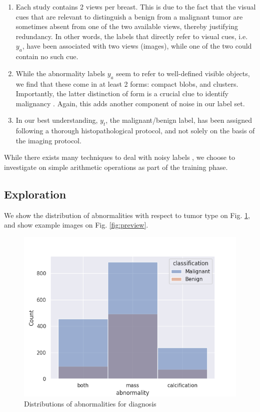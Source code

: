 \documentclass[11pt]{article}
\begin{document}
\begin{enumerate}
\item Each study contains 2 views per breast. This is due to the fact that the visual cues
that are relevant to distinguish a benign from a malignant tumor are
 sometimes absent from one of the two available views, thereby justifying redundancy.
 In other words, the labels that directly refer to visual cues, i.e. \(y_{a}\),
 have been associated with two views (images), while one of the two could contain no
 such cue.

\item While the abnormality labels \(y_{a}\) seem to refer to well-defined visible objects,
we find that these come in at least 2 forms: compact blobs, and clusters.
Importantly, the latter distinction of form is a crucial clue
to identify malignancy \autocite{azam21}.
Again, this adds another component of noise in our label set.

\item In our best understanding, \(y_{t}\), the malignant/benign label, has been
assigned following a thorough histopathological protocol, and not solely on the
basis of the imaging protocol.
\end{enumerate}

While there exists many techniques to deal with noisy labels \autocite{song22},
we choose to investigate on simple arithmetic operations as part of the
training phase.

\subsection{Exploration}
\label{sec:orgb971ab3}

We show the distribution of abnormalities with respect to tumor type on Fig. \ref{fig:distributions},
and show example images on Fig. \ref{fig:preview}.

\begin{figure}[htbp]
\centering
\includegraphics[width=.9\linewidth]{./images/distrib.png}
\caption{\label{fig:distributions}Distributions of abnormalities for diagnosis}
\end{figure}
\end{document}
